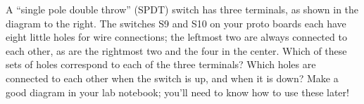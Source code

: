 \begin{enumerate}
\begin{minipage}{.75\textwidth}
\item A ``single pole double throw'' (SPDT) switch has three terminals, as shown in the diagram to the right.  The switches S9 and S10 on your proto boards each have eight little holes for wire connections; the leftmost two are always connected to each other, as are the rightmost two and the four in the center.  Which of these sets of holes correspond to each of the three terminals?  Which holes are connected to each other when the switch is up, and when it is down?  Make a good diagram in your lab notebook; you'll need to know how to use these later! \label{part_switches}
\end{minipage}
\begin{minipage}{.24\textwidth}
\end{minipage}


\end{enumerate}
